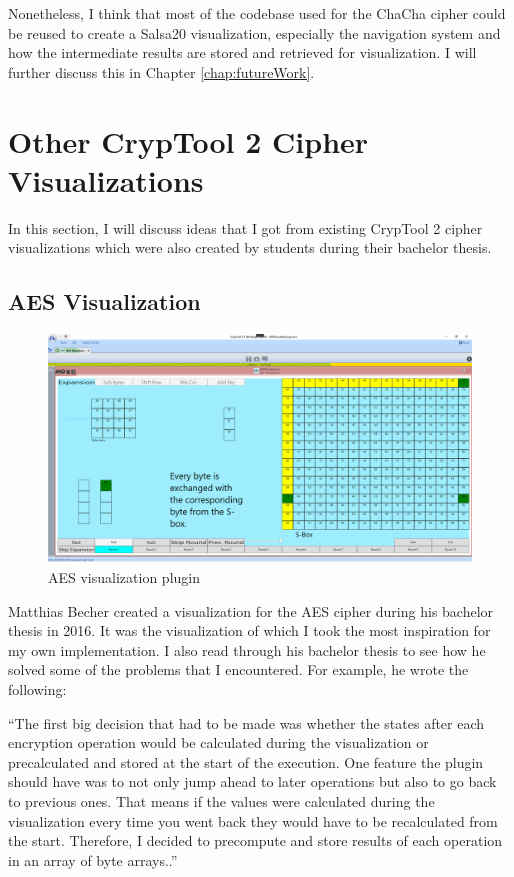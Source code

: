 Nonetheless, I think that most of the codebase used for the ChaCha cipher could be reused to create a Salsa20 visualization, especially the navigation system and how the intermediate results are stored and retrieved for visualization. I will further discuss this in Chapter \ref{chap:futureWork}.


\section{Other CrypTool 2 Cipher Visualizations}
\label{sec:otherCT2CipherVisualizations}

In this section, I will discuss ideas that I got from existing CrypTool 2 cipher visualizations which were also created by students during their bachelor thesis.

\subsection{AES Visualization}
\label{sec:aesVisualization}

\begin{figure}
\label{fig:aes}
\centering
\includegraphics[width=\textwidth]{figures/ct2/aes.png}
\caption{AES visualization plugin}
\end{figure}

Matthias Becher created a visualization for the AES cipher during his bachelor thesis in 2016. It was the visualization of which I took the most inspiration for my own implementation. I also read through his bachelor thesis to see how he solved some of the problems that I encountered. For example, he wrote the following:

``The first big decision that had to be made was whether the states after each encryption operation would be calculated during the visualization or precalculated and stored at the start of the execution. One feature the plugin should have was to not only jump ahead to later operations but also to go back to previous ones. That means if the values were calculated during the visualization every time you went back they would have to be recalculated from the start. Therefore, I decided to precompute and store results of each operation in an array of byte arrays..'' \cite{aesthesis}

